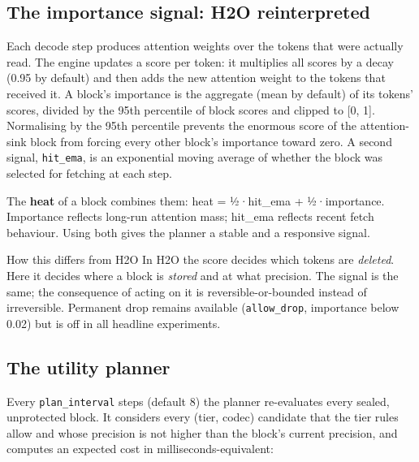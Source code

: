\documentclass[12pt,a4paper]{report}
\begin{document}
\subsection{The importance signal: H2O reinterpreted}\label{sec:5_5}
Each decode step produces attention weights over the tokens that were actually read. The engine updates a score per token: it multiplies all scores by a decay (0.95 by default) and then adds the new attention weight to the tokens that received it. A block's importance is the aggregate (mean by default) of its tokens' scores, divided by the 95th percentile of block scores and clipped to [0, 1]. Normalising by the 95th percentile prevents the enormous score of the attention-sink block from forcing every other block's importance toward zero. A second signal, \texttt{hit\_\allowbreak{}\allowbreak{}ema}, is an exponential moving average of whether the block was selected for fetching at each step.

The \textbf{heat} of a block combines them: heat = ½·hit\_\allowbreak{}ema + ½·importance. Importance reflects long-run attention mass; hit\_\allowbreak{}ema reflects recent fetch behaviour. Using both gives the planner a stable and a responsive signal.

\begin{calloutbox}{How this differs from H2O}
In H2O the score decides which tokens are \textit{deleted}. Here it decides where a block is \textit{stored} and at what precision. The signal is the same; the consequence of acting on it is reversible-or-bounded instead of irreversible. Permanent drop remains available (\texttt{allow\_\allowbreak{}\allowbreak{}drop}, importance below 0.02) but is off in all headline experiments.

\end{calloutbox}
\subsection{The utility planner}\label{sec:5_6}
Every \texttt{plan\_\allowbreak{}\allowbreak{}interval} steps (default 8) the planner re-evaluates every sealed, unprotected block. It considers every (tier, codec) candidate that the tier rules allow and whose precision is not higher than the block's current precision, and computes an expected cost in milliseconds-equivalent:
\end{document}
